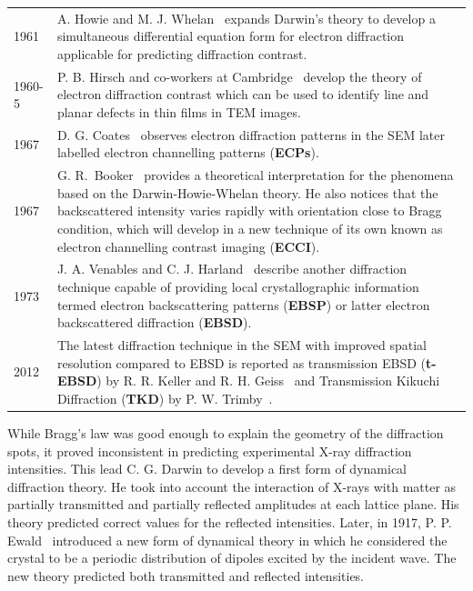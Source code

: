 \begin{table}[htpb]
\begin{tabular}{p{1.2cm}p{11cm}}
  {\small 1961} & {\small A. Howie and M. J. Whelan~\cite{Howie61} expands Darwin's theory to develop a simultaneous differential equation form for electron diffraction applicable for predicting diffraction contrast.}\\
  
  {\small 1960-5} & {\small P. B. Hirsch and co-workers at Cambridge~\cite{Hirsch60, electronMicroscopy} develop the theory of electron diffraction contrast which can be used to identify line and planar defects in thin films in TEM images.}\\
 
  {\small 1967} & {\small D. G. Coates~\cite{Coates67} observes electron diffraction patterns in the SEM later labelled electron channelling patterns (\textbf{ECPs}). }\\
  
  {\small 1967} & {\small  G. R.~Booker~\cite{Booker67} provides a theoretical interpretation for the phenomena based on the Darwin-Howie-Whelan theory. He also notices that the backscattered intensity varies rapidly with orientation close to Bragg condition, which will develop in a new technique of its own known as electron channelling contrast imaging (\textbf{ECCI}).}\\

    {\small 1973} & {\small J. A. Venables and C. J. Harland~\cite{Venables73} describe another diffraction technique capable of providing local crystallographic information termed electron backscattering patterns (\textbf{EBSP}) or latter electron backscattered diffraction (\textbf{EBSD}). }\\
  
   {\small 2012} & {\small The latest diffraction technique in the SEM with improved spatial resolution compared to EBSD is reported as transmission EBSD (\textbf{t-EBSD}) by R. R. Keller and R. H. Geiss~\cite{Keller12} and Transmission Kikuchi Diffraction (\textbf{TKD}) by P. W. Trimby~\cite{Trimby12}. }\\
\bottomrule
\end{tabular}
\end{table}
\renewcommand{\arraystretch}{1.}

While Bragg's law was good enough to explain the geometry of the diffraction spots, it proved inconsistent in predicting experimental X-ray diffraction intensities. This lead C. G. Darwin to develop a first form of dynamical diffraction theory. He took into account the interaction of X-rays with matter as partially transmitted and partially reflected amplitudes at each lattice plane. His theory predicted correct values for the reflected intensities. Later, in 1917, P. P. Ewald~\cite{Ewald17} introduced a new form of dynamical theory in which he considered the crystal to be a periodic distribution of dipoles excited by the incident wave. The new theory predicted both transmitted and reflected intensities. 

